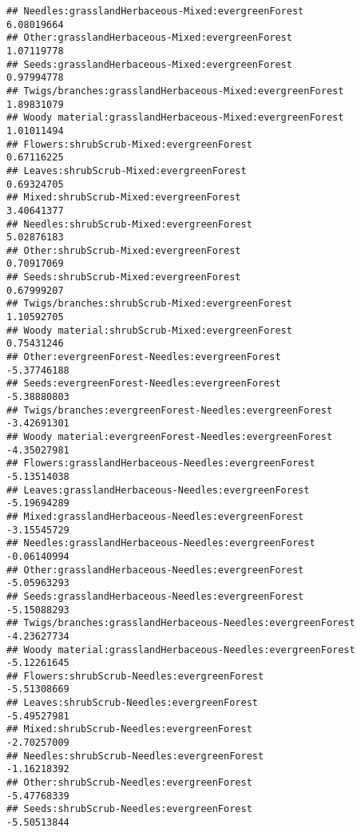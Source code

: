 \documentclass[
]{article}
\begin{document}
\begin{verbatim}
## Needles:grasslandHerbaceous-Mixed:evergreenForest                      6.08019664
## Other:grasslandHerbaceous-Mixed:evergreenForest                        1.07119778
## Seeds:grasslandHerbaceous-Mixed:evergreenForest                        0.97994778
## Twigs/branches:grasslandHerbaceous-Mixed:evergreenForest               1.89831079
## Woody material:grasslandHerbaceous-Mixed:evergreenForest               1.01011494
## Flowers:shrubScrub-Mixed:evergreenForest                               0.67116225
## Leaves:shrubScrub-Mixed:evergreenForest                                0.69324705
## Mixed:shrubScrub-Mixed:evergreenForest                                 3.40641377
## Needles:shrubScrub-Mixed:evergreenForest                               5.02876183
## Other:shrubScrub-Mixed:evergreenForest                                 0.70917069
## Seeds:shrubScrub-Mixed:evergreenForest                                 0.67999207
## Twigs/branches:shrubScrub-Mixed:evergreenForest                        1.10592705
## Woody material:shrubScrub-Mixed:evergreenForest                        0.75431246
## Other:evergreenForest-Needles:evergreenForest                         -5.37746188
## Seeds:evergreenForest-Needles:evergreenForest                         -5.38880803
## Twigs/branches:evergreenForest-Needles:evergreenForest                -3.42691301
## Woody material:evergreenForest-Needles:evergreenForest                -4.35027981
## Flowers:grasslandHerbaceous-Needles:evergreenForest                   -5.13514038
## Leaves:grasslandHerbaceous-Needles:evergreenForest                    -5.19694289
## Mixed:grasslandHerbaceous-Needles:evergreenForest                     -3.15545729
## Needles:grasslandHerbaceous-Needles:evergreenForest                   -0.06140994
## Other:grasslandHerbaceous-Needles:evergreenForest                     -5.05963293
## Seeds:grasslandHerbaceous-Needles:evergreenForest                     -5.15088293
## Twigs/branches:grasslandHerbaceous-Needles:evergreenForest            -4.23627734
## Woody material:grasslandHerbaceous-Needles:evergreenForest            -5.12261645
## Flowers:shrubScrub-Needles:evergreenForest                            -5.51308669
## Leaves:shrubScrub-Needles:evergreenForest                             -5.49527981
## Mixed:shrubScrub-Needles:evergreenForest                              -2.70257009
## Needles:shrubScrub-Needles:evergreenForest                            -1.16218392
## Other:shrubScrub-Needles:evergreenForest                              -5.47768339
## Seeds:shrubScrub-Needles:evergreenForest                              -5.50513844

\end{verbatim}
\end{document}
